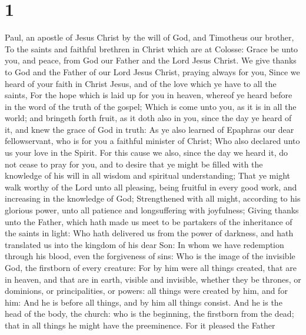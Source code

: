 \hypertarget{section}{%
\section{1}\label{section}}

 Paul, an apostle of Jesus Christ by the will of God, and
Timotheus our brother,  To the saints and faithful
brethren in Christ which are at Colosse: Grace be unto you, and peace,
from God our Father and the Lord Jesus Christ.  We give
thanks to God and the Father of our Lord Jesus Christ, praying always
for you,  Since we heard of your faith in Christ Jesus,
and of the love which ye have to all the saints,  For the
hope which is laid up for you in heaven, whereof ye heard before in the
word of the truth of the gospel;  Which is come unto you,
as it is in all the world; and bringeth forth fruit, as it doth also in
you, since the day ye heard of it, and knew the grace of God in truth:
 As ye also learned of Epaphras our dear fellowservant,
who is for you a faithful minister of Christ;  Who also
declared unto us your love in the Spirit.  For this cause
we also, since the day we heard it, do not cease to pray for you, and to
desire that ye might be filled with the knowledge of his will in all
wisdom and spiritual understanding;  That ye might walk
worthy of the Lord unto all pleasing, being fruitful in every good work,
and increasing in the knowledge of God;  Strengthened
with all might, according to his glorious power, unto all patience and
longsuffering with joyfulness;  Giving thanks unto the
Father, which hath made us meet to be partakers of the inheritance of
the saints in light:  Who hath delivered us from the
power of darkness, and hath translated us into the kingdom of his dear
Son:  In whom we have redemption through his blood, even
the forgiveness of sins:  Who is the image of the
invisible God, the firstborn of every creature:  For by
him were all things created, that are in heaven, and that are in earth,
visible and invisible, whether they be thrones, or dominions, or
principalities, or powers: all things were created by him, and for him:
 And he is before all things, and by him all things
consist.  And he is the head of the body, the church: who
is the beginning, the firstborn from the dead; that in all things he
might have the preeminence.  For it pleased the Father
